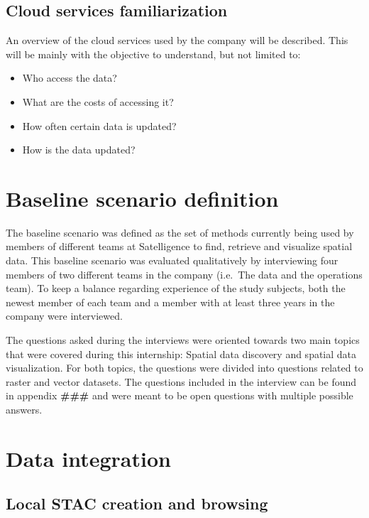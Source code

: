\documentclass[
  oneside,
  open=any]{scrbook}
\begin{document}
\subsection{Cloud services
familiarization}\label{cloud-services-familiarization}

An overview of the cloud services used by the company will be described.
This will be mainly with the objective to understand, but not limited
to:

\begin{itemize}
\item
  Who access the data?
\item
  What are the costs of accessing it?
\item
  How often certain data is updated?
\item
  How is the data updated?
\end{itemize}

\section{Baseline scenario
definition}\label{baseline-scenario-definition}

The baseline scenario was defined as the set of methods currently being
used by members of different teams at Satelligence to find, retrieve and
visualize spatial data. This baseline scenario was evaluated
qualitatively by interviewing four members of two different teams in the
company (i.e.~The data and the operations team). To keep a balance
regarding experience of the study subjects, both the newest member of
each team and a member with at least three years in the company were
interviewed.

The questions asked during the interviews were oriented towards two main
topics that were covered during this internship: Spatial data discovery
and spatial data visualization. For both topics, the questions were
divided into questions related to raster and vector datasets. The
questions included in the interview can be found in appendix
\textbf{\#\#\#} and were meant to be open questions with multiple
possible answers.

\section{Data integration}\label{data-integration}

\subsection{Local STAC creation and
browsing}\label{local-stac-creation-and-browsing}
\end{document}

